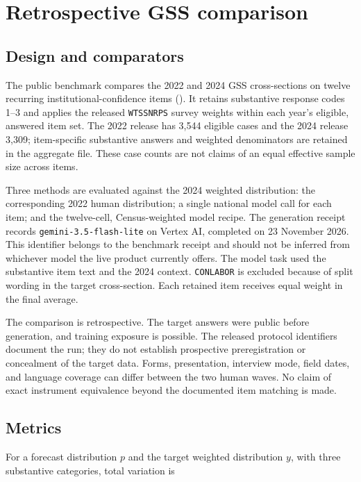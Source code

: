 \documentclass[
  11pt,
]{article}
\let\originalsection\section
\renewcommand{\section}{\Needspace{5\baselineskip}\originalsection}
\begin{document}
\section{Retrospective GSS
comparison}\label{retrospective-gss-comparison}

\subsection{Design and comparators}\label{design-and-comparators}

The public benchmark compares the 2022 and 2024 GSS cross-sections on
twelve recurring institutional-confidence items
(). It
retains substantive response codes 1--3 and applies the released
\texttt{WTSSNRPS} survey weights within each year's eligible, answered
item set. The 2022 release has 3,544 eligible cases and the 2024 release
3,309; item-specific substantive answers and weighted denominators are
retained in the aggregate file. These case counts are not claims of an
equal effective sample size across items.

Three methods are evaluated against the 2024 weighted distribution: the
corresponding 2022 human distribution; a single national model call for
each item; and the twelve-cell, Census-weighted model recipe. The
generation receipt records \texttt{gemini-3.5-flash-lite} on Vertex AI,
completed on 23 November 2026. This identifier belongs to the benchmark
receipt and should not be inferred from whichever model the live product
currently offers. The model task used the substantive item text and the
2024 context. \texttt{CONLABOR} is excluded because of split wording in
the target cross-section. Each retained item receives equal weight in
the final average.

The comparison is retrospective. The target answers were public before
generation, and training exposure is possible. The released protocol
identifiers document the run; they do not establish prospective
preregistration or concealment of the target data. Forms, presentation,
interview mode, field dates, and language coverage can differ between
the two human waves. No claim of exact instrument equivalence beyond the
documented item matching is made.

\subsection{Metrics}\label{metrics}

For a forecast distribution \(p\) and the target weighted distribution
\(y\), with three substantive categories, total variation is
\end{document}

